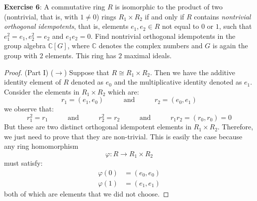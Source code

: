 \documentclass{article}
\begin{document}
\textbf{Exercise 6}: A commutative ring $R$ is isomorphic to the product of two (nontrivial, that is, with $1 \neq 0$) rings $R_{1} \times R_{2}$ if and only if $R$ contains \textit{nontrivial orthogonal idempotents}, that is, elements $e_{1}, e_{2} \in R$ not equal to $0$ or $1$, such that $e^{2}_{1} = e_{1}, e^{2}_{2} = e_{2}$ and $e_{1}e_{2} = 0$. Find nontrivial orthogonal idempotents in the group algebra $\mathbb{C}[G]$, where $\mathbb{C}$ denotes the complex numbers and $G$ is again the group with $2$ elements. This ring has $2$ maximal ideals.
    \begin{proof}
        (Part I) ($\rightarrow $) Suppose that $R \cong R_{1} \times R_{2}$. Then we have the additive identity element of $R$ denoted as $e_{0}$ and the multiplicative identity denoted as $e_{1}$. Consider the elements in $R_{1} \times R_{2}$ which are:
            \begin{equation*}
                r_{1} = (e_{1}, e_{0}) \hspace{30pt} \text{ and } \hspace{30pt} r_{2} = (e_{0}, e_{1})
            \end{equation*}
        we observe that:
            \begin{equation*}
                r_{1}^{2} = r_{1} \hspace{30pt} \text{ and } \hspace{30pt} r_{2}^{2} = r_{2} \hspace{30pt} \text{ and } \hspace{30pt} r_{1}r_{2} = (r_{0}, r_{0}) = 0
            \end{equation*}
        But these are two distinct orthogonal idempotent elements in $R_{1} \times R_{2}$. Therefore, we just need to prove that they are non-trivial. This is easily the case because any ring homomorphism
            \begin{equation*}
                \varphi: R \rightarrow R_{1} \times R_{2}
            \end{equation*}
        must satisfy:
            \begin{align*}
                \varphi(0) &= (e_{0}, e_{0}) \\
                \varphi(1) &= (e_{1}, e_{1})               
            \end{align*}
        both of which are elements that we did not choose.


\end{proof}
\end{document}
